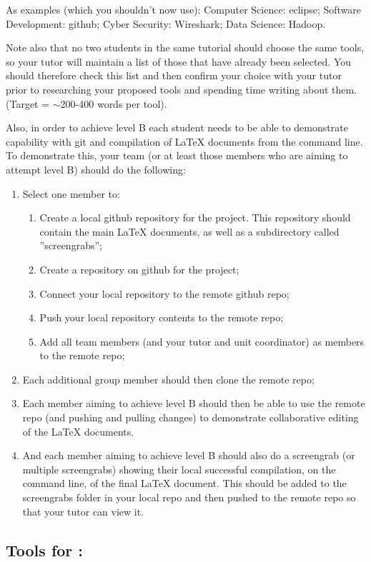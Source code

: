 \documentclass[a4paper, 11pt]{report}
\begin{document}
As examples (which you shouldn't now use): Computer Science: eclipse; Software Development: github; Cyber Security: Wireshark; Data Science: Hadoop.

Note also that no two students in the same tutorial should choose the same tools, so your tutor will maintain a list of those that have already been selected. You should therefore check this list and then confirm your choice with your tutor prior to researching your proposed tools and spending time writing about them. (Target = $\sim$200-400 words per tool).

Also, in order to achieve level B each student needs to be able to demonstrate capability with git and compilation of LaTeX documents from the command line. To demonstrate this, your team (or at least those members who are aiming to attempt level B) should do the following:
\begin{enumerate}
	\item Select one member to:
	\begin{enumerate}
		\item Create a local github repository for the project. This repository should contain the main LaTeX documents, as well as a subdirectory called ''screengrabs'';
		\item Create a repository on github for the project;
		\item Connect your local repository to the remote github repo;
		\item Push your local repository contents to the remote repo;
		\item Add all team members (and your tutor and unit coordinator) as members to the remote repo;
	\end{enumerate}
	\item Each additional group member should then clone the remote repo;
	\item Each member aiming to achieve level B should then be able to use the remote repo (and pushing and pulling changes) to demonstrate collaborative editing of the LaTeX documents.
	\item And each member aiming to achieve level B should also do a screengrab (or multiple screengrabs) showing their local successful compilation, on the command line, of the final LaTeX document. This should be added to the screengrabs folder in your local repo and then pushed to the remote repo so that your tutor can view it.
\end{enumerate}

\subsection{Tools for \majA: \studA}
\end{document}
